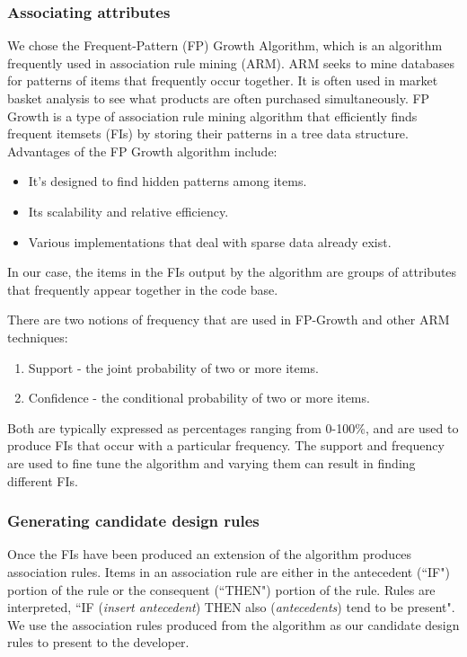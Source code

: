 \documentclass[12pt]{article}
\begin{document}
	
	
\subsubsection{Associating attributes}
	We chose the Frequent-Pattern (FP) Growth Algorithm, which is an algorithm frequently used in association rule mining (ARM). ARM seeks to mine databases for patterns of items that frequently occur together. It is often used in market basket analysis to see what products are often purchased simultaneously. FP Growth is a type of association rule mining algorithm that efficiently finds frequent itemsets (FIs) by storing their patterns in a tree data structure. Advantages of the FP Growth algorithm include:
	\begin{itemize}
		\item It’s designed to find hidden patterns among items.
		\item Its scalability and relative efficiency.
		\item Various implementations that deal with sparse data already exist.
	\end{itemize}
In our case, the items in the FIs output by the algorithm are groups of attributes that frequently appear together in the code base.

There are two notions of frequency that are used in FP-Growth and other ARM techniques:
	\begin{enumerate}
		\item Support - the joint probability of two or more items.
		\item Confidence - the conditional probability of two or more items.
	\end{enumerate} 
Both are typically expressed as percentages ranging from 0-100\%, and are used to produce FIs that occur with a particular frequency. The support and frequency are used to fine tune the algorithm and varying them can result in finding different FIs.

\subsubsection{Generating candidate design rules}

Once the FIs have been produced an extension of the algorithm produces association rules. Items in an association rule are either in the antecedent (``IF") portion of the rule or the consequent (``THEN") portion of the rule. Rules are interpreted, ``IF (\textit{insert antecedent}) THEN also (\textit{antecedents}) tend to be present". We use the association rules produced from the algorithm as our candidate design rules to present to the developer.
\end{document}
